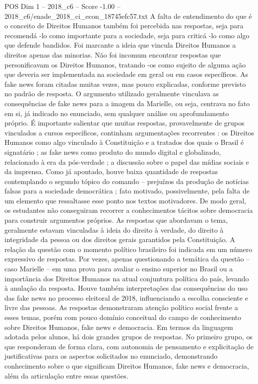 \begin{textsample}{POS Dim 1 – 2018\_c6 – Score -1.00 – 2018\_c6/enade\_2018\_ci\_econ\_18745efc57.txt}
A falta de entendimento do que é o conceito de Direitos Humanos também foi percebida nas respostas, seja para recomendá -lo como importante para a sociedade, seja para criticá -lo como algo que defende bandidos.
Foi marcante a ideia que vincula Direitos Humanos a direitos apenas das minorias.
Não foi incomum encontrar respostas que personificavam os Direitos Humanos, tratando -os como sujeito de alguma ação que deveria ser implementada na sociedade em geral ou em casos específicos.
As fake news foram citadas muitas vezes, mas pouco explicadas, conforme previsto no padrão de resposta.
O argumento utilizado geralmente vinculava as consequências de fake news para a imagem da Marielle, ou seja, centrava no fato em si, já indicado no enunciado, sem qualquer análise ou aprofundamento próprio.
É importante salientar que muitas respostas, provavelmente de grupos vinculados a cursos específicos, continham argumentações recorrentes : os Direitos Humanos como algo vinculado à Constituição e a tratados dos quais o Brasil é signatário ; as fake news como produto do mundo digital e globalizado, relacionado à era da pós-verdade ; a discussão sobre o papel das mídias sociais e da imprensa.
Como já apontado, houve baixa quantidade de respostas contemplando o segundo tópico do comando – prejuízos da produção de notícias falsas para a sociedade democrática ; fato motivado, possivelmente, pela falta de um elemento que ressaltasse esse ponto nos textos motivadores.
De modo geral, os estudantes não conseguiram recorrer a conhecimentos tácitos sobre democracia para construir argumentos próprios.
As respostas que abordavam o tema, geralmente estavam vinculadas à ideia do direito à verdade, do direito à integridade da pessoa ou dos direitos gerais garantidos pela Constituição.
A relação da questão com o momento político brasileiro foi indicada em um número expressivo de respostas.
Por vezes, apenas questionando a temática da questão – caso Marielle – em uma prova para avaliar o ensino superior no Brasil ou a importância dos Direitos Humanos na atual conjuntura política do país, levando à anulação da resposta.
Houve também interpretações das consequências do uso das fake news no processo eleitoral de 2018, influenciando a escolha consciente e livre das pessoas.
As respostas demonstraram atenção político social frente a esses temas, porém com pouco domínio conceitual do campo de conhecimento sobre Direitos Humanos, fake news e democracia.
Em termos da linguagem adotada pelos alunos, há dois grandes grupos de respostas.
No primeiro grupo, os que responderam de forma clara, com autonomia de pensamento e explicitação de justificativas para os aspectos solicitados no enunciado, demonstrando conhecimento sobre o que significam Direitos Humanos, fake news e democracia, além da articulação entre essas questões.

\end{textsample}
